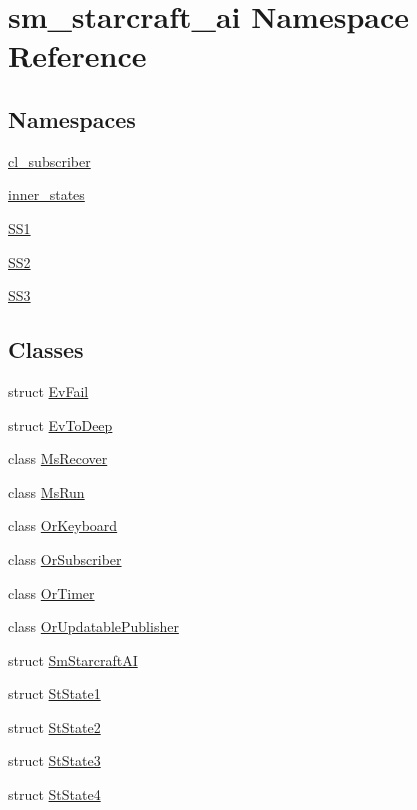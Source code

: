 \hypertarget{namespacesm__starcraft__ai}{}\section{sm\+\_\+starcraft\+\_\+ai Namespace Reference}
\label{namespacesm__starcraft__ai}
\subsection*{Namespaces}
\begin{DoxyCompactItemize}
\item 
 \hyperlink{namespacesm__starcraft__ai_1_1cl__subscriber}{cl\+\_\+subscriber}
\item 
 \hyperlink{namespacesm__starcraft__ai_1_1inner__states}{inner\+\_\+states}
\item 
 \hyperlink{namespacesm__starcraft__ai_1_1SS1}{S\+S1}
\item 
 \hyperlink{namespacesm__starcraft__ai_1_1SS2}{S\+S2}
\item 
 \hyperlink{namespacesm__starcraft__ai_1_1SS3}{S\+S3}
\end{DoxyCompactItemize}
\subsection*{Classes}
\begin{DoxyCompactItemize}
\item 
struct \hyperlink{structsm__starcraft__ai_1_1EvFail}{Ev\+Fail}
\item 
struct \hyperlink{structsm__starcraft__ai_1_1EvToDeep}{Ev\+To\+Deep}
\item 
class \hyperlink{classsm__starcraft__ai_1_1MsRecover}{Ms\+Recover}
\item 
class \hyperlink{classsm__starcraft__ai_1_1MsRun}{Ms\+Run}
\item 
class \hyperlink{classsm__starcraft__ai_1_1OrKeyboard}{Or\+Keyboard}
\item 
class \hyperlink{classsm__starcraft__ai_1_1OrSubscriber}{Or\+Subscriber}
\item 
class \hyperlink{classsm__starcraft__ai_1_1OrTimer}{Or\+Timer}
\item 
class \hyperlink{classsm__starcraft__ai_1_1OrUpdatablePublisher}{Or\+Updatable\+Publisher}
\item 
struct \hyperlink{structsm__starcraft__ai_1_1SmStarcraftAI}{Sm\+Starcraft\+AI}
\item 
struct \hyperlink{structsm__starcraft__ai_1_1StState1}{St\+State1}
\item 
struct \hyperlink{structsm__starcraft__ai_1_1StState2}{St\+State2}
\item 
struct \hyperlink{structsm__starcraft__ai_1_1StState3}{St\+State3}
\item 
struct \hyperlink{structsm__starcraft__ai_1_1StState4}{St\+State4}
\end{DoxyCompactItemize}
